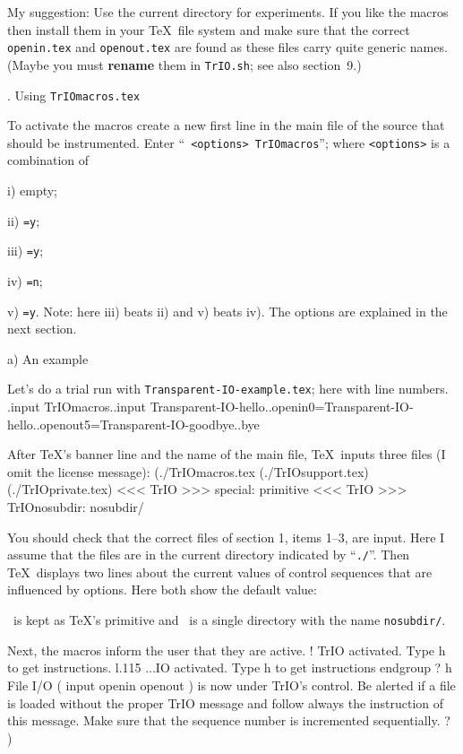 My suggestion: Use the current directory for experiments. If you like
the macros then install them in your \TeX\ file system and make sure
that the correct {\tt openin.tex} and {\tt openout.tex} are found as
these files carry quite generic names. (Maybe you must {\bf rename}
them in {\tt TrIO.sh}; see also section~9.)




. Using {\tt TrIOmacros.tex}

To activate the macros create a new first line in the main file of the
source that should be instrumented. Enter ``{\tt
<options> \cs\space TrIOmacros}''; where {\tt <options>} is a
combination of
\medskip
\item{i)} empty;
\item{ii)} {\tt\cs\let\cs\twonosubdirs=y};
\item{iii)} {\tt\cs\let\cs\threenosubdirs=y};
\item{iv)} {\tt\cs\let\cs\disablespecial=n};
\item{v)} {\tt\cs\let\cs\disablespecial=y}.
\medskip\noindent
Note: here iii) beats ii) and v) beats iv). The options are explained
in the next section.

\beginsection \rm a) An example

Let's do a trial run with {\tt Transparent-IO-example.tex}; here with
line numbers.
.\bs input TrIOmacros..\bs input Transparent-IO-hello..\bs openin0=Transparent-IO-hello..\bs openout5=Transparent-IO-goodbye..\bs bye\endverbatim

After \TeX's banner line and the name of
the main file, \TeX\ inputs three files (I omit the license message):
\beginverbatim
(./TrIOmacros.tex (./TrIOsupport.tex) (./TrIOprivate.tex)\parni
<<< TrIO >>> \bs special: primitive\parni
<<< TrIO >>> \bs TrIOnosubdir: nosubdir/\endverbatim

You should check that the correct files of section 1, items 1--3, are
input. Here I assume that the files are in the current directory
indicated by ``{\tt./}''. Then \TeX\ displays two lines about the
current values of control sequences that are influenced by
options. Here both show the default value: \cs\special\ is kept
as \TeX's primitive and \cs\TrIOnosubdir\ is a single directory
with the name {\tt nosubdir/}.

Next, the macros inform the user that they are active. 
\beginverbatim
! TrIO activated. Type h to get instructions.\parni
l.115 ...IO activated. Type h to get instructions\ccb\parni
\fortyspaces\tenspaces\bs endgroup\parni
? h\parni
File I/O ( \bs input \bs openin \bs openout ) is now under TrIO's control.\parni
Be alerted if a file is loaded without the proper TrIO message\parni
and follow always the instruction of this message.\parni
Make sure that the sequence number is incremented sequentially.\parni
? \parni
)\endverbatim

